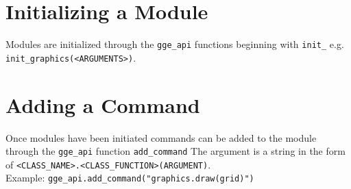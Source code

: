 \documentclass{article}
\begin{document}
\section{Initializing a Module}
Modules are initialized through the \verb|gge_api| functions beginning with \verb|init_| e.g.
\verb|init_graphics(<ARGUMENTS>)|.

\section{Adding a Command} \label{adding a command}
Once modules have been initiated commands can be added to the module through the \verb|gge_api| function
\verb|add_command|
The argument is a string in the form of \verb|<CLASS_NAME>.<CLASS_FUNCTION>(ARGUMENT)|.
\\
Example: \verb|gge_api.add_command("graphics.draw(grid)")|
\end{document}
